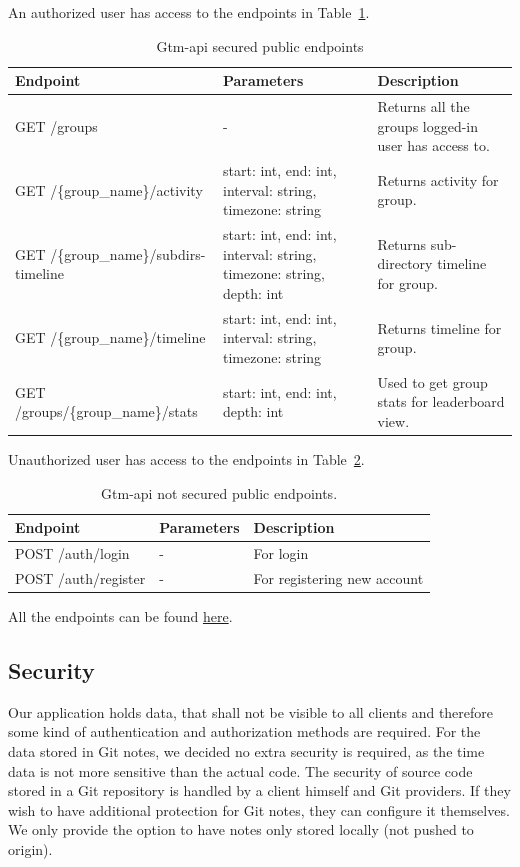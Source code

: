 An authorized user has access to the endpoints in Table~\ref{tab:gtm-api-endpoints-secured}.
\begin{table}[H]
    \centering
    \begin{tabular}{ | p{5cm} | p{4cm} | p{5cm} |}
        \hline
        \textbf{Endpoint} & \textbf{Parameters} & \textbf{Description}\\
        \hline
        GET /groups & - & Returns all the groups logged-in user has access to. \\
        \hline
        GET /\{group\_name\}/activity & start: int, end: int, interval: string, timezone: string & Returns activity for group. \\
        \hline
        GET /\{group\_name\}/subdirs-timeline & start: int, end: int, interval: string, timezone: string, depth: int & Returns sub-directory timeline for group. \\
        \hline
        GET /\{group\_name\}/timeline & start: int, end: int, interval: string, timezone: string & Returns timeline for group. \\
        \hline
        GET /groups/\{group\_name\}/stats & start: int, end: int, depth: int & Used to get group stats for leaderboard view.\\
        \hline
    \end{tabular}
    \caption{Gtm-api secured public endpoints}
    \label{tab:gtm-api-endpoints-secured}
\end{table}

Unauthorized user has access to the endpoints in Table~\ref{tab:gtm-api-endpoints-public}.
\begin{table}[H]
    \centering
    \begin{tabular}{ | p{5cm} | p{4cm} | p{5cm} |}
        \hline
        \textbf{Endpoint} & \textbf{Parameters} & \textbf{Description}\\
        \hline
        POST /auth/login & - & For login \\
        \hline
        POST /auth/register & - & For registering new account \\
        \hline
    \end{tabular}
    \caption{Gtm-api not secured public endpoints.}
    \label{tab:gtm-api-endpoints-public}
\end{table}

All the endpoints can be found \href{https://cs.ttu.ee/services/gtm/api/swagger/index.html}{here}.

\subsection{Security}\label{subsec:scurity}
Our application holds data, that shall not be visible to all clients and therefore some kind of authentication and authorization methods are required.
For the data stored in Git notes, we decided no extra security is required, as the time data is not more sensitive than the actual code.
The security of source code stored in a Git repository is handled by a client himself and Git providers. %
If they wish to have additional protection for Git notes, they can configure it themselves.
We only provide the option to have notes only stored locally (not pushed to origin).

